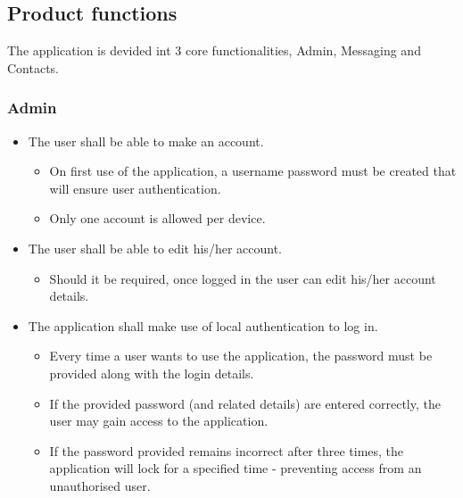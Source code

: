 \subsection{Product functions}
The application is devided int 3 core functionalities, Admin, Messaging and Contacts.

\subsubsection{Admin}
\begin{itemize}
\item The user shall be able to make an account.
\begin{itemize}
\item On first use of the application, a username password must be created that will ensure user authentication.
\item Only one account is allowed per device.
\end{itemize}
\item The user shall be able to edit his/her account.
\begin{itemize}
\item Should it be required, once logged in the user can edit his/her account details.
\end{itemize}
\item The application shall make use of local authentication to log in.
\begin{itemize}
\item Every time a user wants to use the application, the password must be provided along with the login details.
\item If the provided password (and related details) are entered correctly, the user may gain access to the application.
\item If the password provided remains incorrect after three times, the application will lock for a specified time - preventing access from an unauthorised user.
\end{itemize}
\end{itemize}

